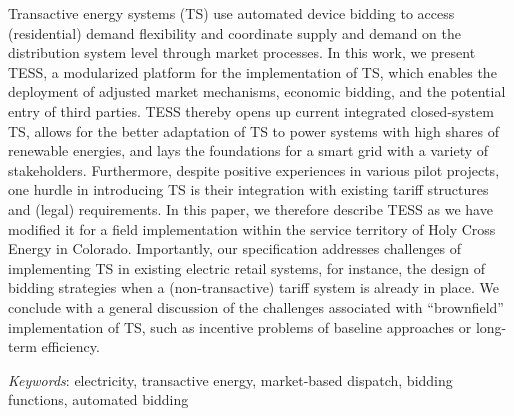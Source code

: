 \documentclass[12pt]{article}%
\begin{document}
\noindent 
Transactive energy systems (TS) use automated device bidding to access (residential) demand flexibility and coordinate supply and demand on the distribution system level through market processes. 
In this work, we present TESS, a modularized platform for the implementation of TS, which enables the deployment of adjusted market mechanisms, economic bidding, and the potential entry of third parties. TESS thereby opens up current integrated closed-system TS, allows for the better adaptation of TS to power systems with high shares of renewable energies, and lays the foundations for a smart grid with a variety of stakeholders.
Furthermore, despite positive experiences in various pilot projects, one hurdle in introducing TS is their integration with existing tariff structures and (legal) requirements. In this paper, we therefore describe TESS as we have modified it for a field implementation within the service territory of Holy Cross Energy in Colorado. Importantly, our specification addresses challenges of implementing TS in existing electric retail systems, for instance, the design of bidding strategies when a (non-transactive) tariff system is already in place.
We conclude with a general discussion of the challenges associated with ``brownfield'' implementation of TS, such as incentive problems of baseline approaches or long-term efficiency.

\medskip
\vspace{0.5cm}
\noindent \textit{Keywords}: electricity, transactive energy, market-based dispatch, bidding functions, automated bidding
\end{document}
